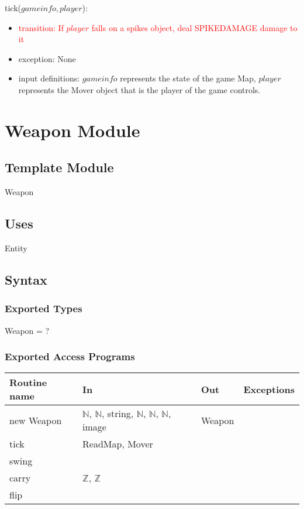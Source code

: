 \documentclass[12pt]{article}
\newcommand{\Implies}{\Rightarrow}
\newcommand{\m}[1]{\mbox{#1}}
\begin{document}
\noindent
tick($gameinfo, player$):
\begin{itemize}
    \item \textcolor{red}{transition: If $player$ falls on a spikes object, deal SPIKEDAMAGE damage to it}
    \item exception: None
    \item input definitions: $gameinfo$ represents the state of the game Map, $player$ represents the Mover object that is the player of the game controls.
\end{itemize}

\newpage

\section*{Weapon Module}

\subsection*{Template Module}

Weapon

\subsection*{Uses}

Entity

\subsection*{Syntax}

\subsubsection*{Exported Types}

Weapon = ?

\subsubsection*{Exported Access Programs}

\begin{tabular}{| l | l | l | l |}
\hline
\textbf{Routine name} & \textbf{In} & \textbf{Out} & \textbf{Exceptions}\\
\hline
new Weapon & $\mathbb{N}$, $\mathbb{N}$, string, $\mathbb{N}$, $\mathbb{N}$, $\mathbb{N}$, image & Weapon & ~\\
\hline
tick & ReadMap, Mover & ~ & ~\\
\hline
swing & ~ & ~ & ~\\
\hline
carry & $\mathbb{Z}$, $\mathbb{Z}$ & ~ & ~\\
\hline
flip & ~ & ~ & ~\\
\hline
\end{tabular}
\end{document}
